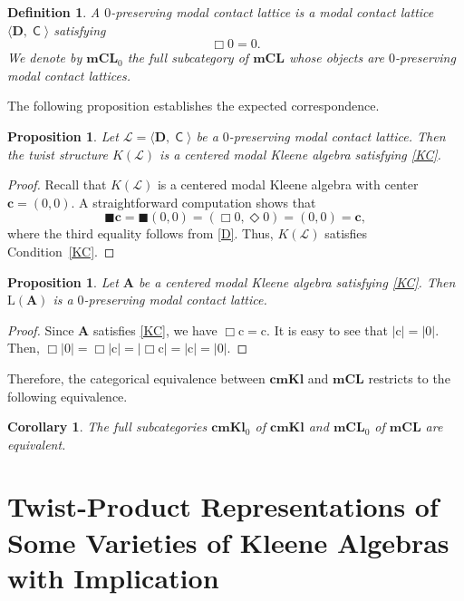 \documentclass[10pt,a4paper]{amsart}
\newtheorem{proposition}[theorem]{Proposition}
\newtheorem{corollary}[theorem]{Corollary}
\newtheorem{definition}[theorem]{Definition}
\DeclareMathOperator{\con}{\mathsf{C}}
\newcommand{\cn}{\mathrm{c}}
\newcommand{\cbf}{\mathbf{c}}
\newcommand{\A}{\mathbf{A}}
\newcommand{\D}{\mathbf{D}}
\newcommand{\boxn}{\blacksquare}
\begin{document}
\begin{definition}
A \emph{$0$-preserving modal contact lattice} is a modal contact lattice
$\langle\D,\con\rangle$ satisfying
\begin{equation}
\label{D}\tag{D}
\Box0=0.
\end{equation}
We denote by $\mathbf{mCL}_0$ the full subcategory of $\mathbf{mCL}$ whose objects are $0$-preserving modal contact lattices.
\end{definition}

The following proposition establishes the expected correspondence.

\begin{proposition}
\label{pro:mCLc-mKLc}
Let $\mathcal{L}=\langle\D,\con\rangle$ be a $0$-preserving modal contact lattice. Then the twist structure $K(\mathcal{L})$
is a centered modal Kleene algebra satisfying \eqref{KC}.
\end{proposition}
\begin{proof}
Recall that $K(\mathcal{L})$ is a centered modal Kleene algebra with center
$\cbf=(0,0)$.  A straightforward computation shows that 
\[
\boxn\cbf
=\boxn(0,0)
=(\Box0,\Diamond0)
=(0,0)
=\cbf,
\]
where the third equality follows from \eqref{D}.  Thus,
$K(\mathcal{L})$ satisfies Condition~\eqref{KC}.
\end{proof}

\begin{proposition}
Let $\A$ be a centered modal Kleene algebra satisfying \eqref{KC}. Then
$\mathrm{L}(\A)$ is a $0$-preserving modal contact lattice.
\end{proposition}
\begin{proof}
Since $\A$ satisfies \eqref{KC}, we have $\Box \cn=\cn$. It is easy to see that $|\cn|=|0|$. Then, $\Box |0|=\Box |\cn|=|\Box \cn|=|\cn|=|0|$.
\end{proof}

Therefore, the categorical equivalence between $\mathbf{cmKl}$ and
$\mathbf{mCL}$ restricts to the following equivalence.

\begin{corollary}
\label{cor:equiv-mKLc-mCLc}
The full subcategories $\mathbf{cmKl}_0$ of $\mathbf{cmKl}$ and
$\mathbf{mCL}_0$ of $\mathbf{mCL}$ are equivalent.
\end{corollary}


\section{Twist-Product Representations of Some Varieties of Kleene Algebras with Implication}\label{sec:implicative}
\end{document}
